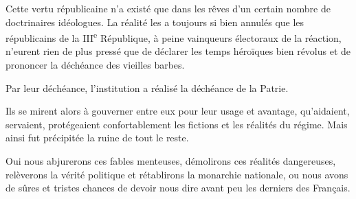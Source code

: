 \documentclass[french,twoside]{book} %
\newif\ifdev
\renewcommand{\LettrineFontHook}{\color{rubric}}
\newcommand{\initialiv}[2]{%
  \let\oldLFH\LettrineFontHook
  \IfSubStr{QJ’}{#1}{
    \lettrine[lines=4, lhang=0.2, loversize=-0.1, lraise=0.2]{\smash{#1}}{#2}
  }{\IfSubStr{É}{#1}{
    \lettrine[lines=4, lhang=0.2, loversize=-0, lraise=0]{\smash{#1}}{#2}
  }{\IfSubStr{ÀÂ}{#1}{
    \lettrine[lines=4, lhang=0.2, loversize=-0, lraise=0, slope=0.6em]{\smash{#1}}{#2}
  }{\IfSubStr{A}{#1}{
    \lettrine[lines=4, lhang=0.2, loversize=0.2, slope=0.6em]{\smash{#1}}{#2}
  }{\IfSubStr{V}{#1}{
    \lettrine[lines=4, lhang=0.2, loversize=0.2, slope=-0.5em]{\smash{#1}}{#2}
  }{
    \lettrine[lines=4, lhang=0.2, loversize=0.2]{\smash{#1}}{#2}
  }}}}}
  \let\LettrineFontHook\oldLFH
}
\newcommand\chapterclose{} %
\renewcommand{\LettrineFontHook}{\bfseries\color{rubric}}
\begin{document}
Cette vertu républicaine n’a existé que dans les rêves d’un certain nombre de doctrinaires idéologues. La réalité les a toujours si bien annulés que les républicains de la III\textsuperscript{e} République, à peine vainqueurs électoraux de la réaction, n’eurent rien de plus pressé que de déclarer les temps héroïques bien révolus et de prononcer la déchéance des vieilles barbes.\par
Par leur déchéance, l’institution a réalisé la déchéance de la Patrie.\par
Ils se mirent alors à gouverner entre eux pour leur usage et avantage, qu’aidaient, servaient, protégeaient confortablement les fictions et les réalités du régime. Mais ainsi fut précipitée la ruine de tout le reste.\par
Oui nous abjurerons ces fables menteuses, démolirons ces réalités dangereuses, relèverons la vérité politique et rétablirons la monarchie nationale, ou nous avons de sûres et tristes chances de devoir nous dire avant peu les derniers des Français.
\chapterclose

 


\ifbooklet
  \newpage\null\thispagestyle{empty}\newpage
\fi

\ifdev %
\fontname\font — \textsc{Les règles du jeu}\par
(\hyperref[utopie]{\underline{Lien}})\par
\noindent \initialiv{A}{lors là}\blindtext\par
\noindent \initialiv{À}{ la bonheur des dames}\blindtext\par
\noindent \initialiv{É}{tonnez-le}\blindtext\par
\noindent \initialiv{Q}{ualitativement}\blindtext\par
\noindent \initialiv{V}{aloriser}\blindtext\par
\Blindtext
\phantomsection
\label{utopie}
\Blinddocument
\fi
\end{document}
